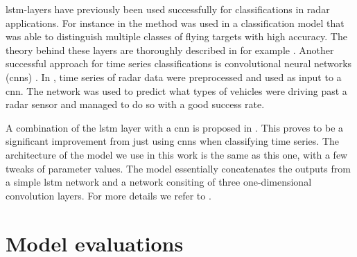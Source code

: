 \gls{lstm}-layers have previously been used successfully for classifications in radar applications. For instance in \citep{jithesh_sagayaraj_srinivasa_2018} the method was used in a classification model that was able to distinguish multiple classes of flying targets with high accuracy. The theory behind these layers are thoroughly described in for example \citep{hochreiter_schmidhuber_1997}. Another successful approach for time series classifications is convolutional neural networks (\gls{cnn}s) \citep{karim_majumdar_darabi_chen_2018}. In \citep{capobianco_facheris_cuccoli_marinai_2017}, time series of radar data were preprocessed and used as input to a \gls{cnn}. The network was used to predict what types of vehicles were driving past a radar sensor and managed to do so with a good success rate.

A combination of the \gls{lstm} layer with a \gls{cnn} is proposed in \citep{karim_majumdar_darabi_chen_2018}. This proves to be a significant improvement from just using \gls{cnn}s when classifying time series. The architecture of the model we use in this work is the same as this one, with a few tweaks of parameter values. The model essentially concatenates the outputs from a simple \gls{lstm} network and a network consiting of three one-dimensional convolution layers. For more details we refer to \citep{karim_majumdar_darabi_chen_2018}.

\section{Model evaluations}





